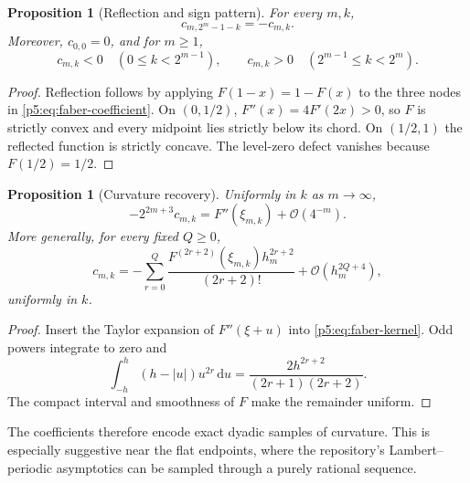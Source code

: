 \documentclass[11pt,oneside]{article}
\newtheorem{proposition}[theorem]{Proposition}
\theoremstyle{definition}
\newcommand{\dd}{\,\mathrm d}
\newcommand{\bigO}{\mathcal O}
\begin{document}
\begin{proposition}[Reflection and sign pattern]
\label{p5:prop:faber-sign}
For every $m,k$,
\begin{equation}
 c_{m,2^m-1-k}=-c_{m,k}.                                 \label{p5:eq:faber-reflection}
\end{equation}
Moreover, $c_{0,0}=0$, and for $m\ge1$,
\begin{equation}
 c_{m,k}<0\quad(0\le k<2^{m-1}),
 \qquad
 c_{m,k}>0\quad(2^{m-1}\le k<2^m).                     \label{p5:eq:faber-sign}
\end{equation}
\end{proposition}

\begin{proof}
Reflection follows by applying $F(1-x)=1-F(x)$ to the three nodes in
\eqref{p5:eq:faber-coefficient}.  On $(0,1/2)$,
$F''(x)=4F'(2x)>0$, so $F$ is strictly convex and every midpoint lies strictly
below its chord.  On $(1/2,1)$ the reflected function is strictly concave.
The level-zero defect vanishes because $F(1/2)=1/2$.
\end{proof}

\begin{proposition}[Curvature recovery]
\label{p5:prop:faber-curvature}
Uniformly in $k$ as $m\to\infty$,
\begin{equation}
 -2^{2m+3}c_{m,k}
 =F''(\xi_{m,k})+\bigO(4^{-m}).                          \label{p5:eq:faber-curvature}
\end{equation}
More generally, for every fixed $Q\ge0$,
\begin{equation}
 c_{m,k}=-\sum_{r=0}^{Q}
 \frac{F^{(2r+2)}(\xi_{m,k})h_m^{2r+2}}{(2r+2)!}
 +\bigO(h_m^{2Q+4}),                                     \label{p5:eq:faber-curvature-full}
\end{equation}
uniformly in $k$.
\end{proposition}

\begin{proof}
Insert the Taylor expansion of $F''(\xi+u)$ into
\eqref{p5:eq:faber-kernel}.  Odd powers integrate to zero and
\[
 \int_{-h}^{h}(h-|u|)u^{2r}\dd u
 =\frac{2h^{2r+2}}{(2r+1)(2r+2)}.
\]
The compact interval and smoothness of $F$ make the remainder uniform.
\end{proof}

The coefficients therefore encode exact dyadic samples of curvature.  This
is especially suggestive near the flat endpoints, where the repository's
Lambert--periodic asymptotics can be sampled through a purely rational
sequence.
\end{document}
